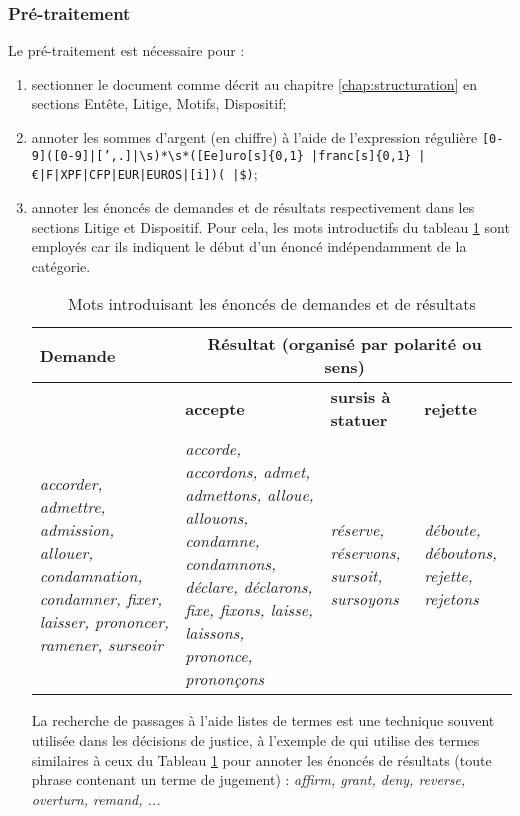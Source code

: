 \subsubsection{Pré-traitement}

Le pré-traitement est nécessaire pour :
\begin{enumerate}
	\item sectionner le document comme décrit au chapitre \ref{chap:structuration} en sections Entête, Litige, Motifs, Dispositif;
	\item annoter les sommes d'argent (en chiffre) à l'aide de l'expression régulière \og \texttt{[0-9]([0-9]|[',.]|\textbackslash s)*\textbackslash s*([Ee]uro[s]\{0,1\} |franc[s]\{0,1\} |\euro|F|XPF|CFP|EUR|EUROS|[i])( |\$)}\fg{};
	\item annoter les énoncés de demandes et de résultats respectivement dans les sections Litige et Dispositif. Pour cela, les mots introductifs du tableau \ref{tab:quanta:mots-introductifs} sont employés car ils indiquent le début d'un énoncé indépendamment de la catégorie.
	 
	\begin{table}[!htb]
		\centering
		\scriptsize
		\begin{tabular}{|p{}|p{}|p{}|p{}|}
			\hline
			\textbf{Demande} & \multicolumn{3}{c|}{\textbf{Résultat} (organisé par polarité ou sens)} \\ \hline
			& \textbf{accepte}  &\textbf{sursis à statuer} & \textbf{rejette}  \\ \hline
			\textit{accorder, admettre, admission, allouer, condamnation, condamner, fixer, laisser, prononcer, ramener, surseoir} & \textit{accorde, accordons, admet, admettons, alloue, allouons, condamne, condamnons, déclare, déclarons, fixe, fixons, laisse, laissons, prononce, prononçons} & \textit{réserve, réservons, sursoit, sursoyons} & \textit{déboute, déboutons, rejette, rejetons} \\ \hline
		\end{tabular}
		\caption{Mots introduisant les énoncés de demandes et de résultats}\label{tab:quanta:mots-introductifs}
	\end{table}

	La recherche de passages à l'aide listes de termes est une technique souvent utilisée dans les décisions de justice, à l'exemple de \cite{wyner2010extractlegalelts} qui utilise des termes similaires à ceux du Tableau \ref{tab:quanta:mots-introductifs} pour annoter les énoncés de résultats (toute phrase contenant un terme de jugement) : \textit{affirm, grant, deny, reverse, overturn, remand, ...}
\end{enumerate} 

